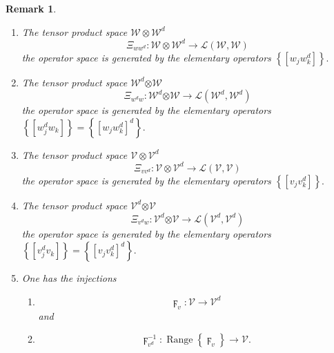 \documentclass[aps,preprint]{revtex4}%
\newtheorem{remark}[theorem]{Remark}
\begin{document}
\begin{remark}
\begin{enumerate}
\item The tensor product space $\mathcal{W\otimes W}^{d}$%
\begin{equation}
\Xi_{ww^{d}}:\mathcal{W\otimes W}^{d}\rightarrow\mathcal{L}\left(
\mathcal{W},\mathcal{W}\right)
\end{equation}
the operator space is generated by the elementary operators $\left\{  \left[
w_{j}w_{k}^{d}\right]  \right\}  .$

\item The tensor product space $\mathcal{W}^{d}\mathcal{\otimes W}$%
\begin{equation}
\Xi_{w^{d}w}:\mathcal{W}^{d}\mathcal{\otimes W}\rightarrow\mathcal{L}\left(
\mathcal{W}^{d},\mathcal{W}^{d}\right)
\end{equation}
the operator space is generated by the elementary operators $\left\{  \left[
w_{j}^{d}w_{k}\right]  \right\}  =\left\{  \left[  w_{j}w_{k}^{d}\right]
^{d}\right\}  .$

\item The tensor product space $\mathcal{V\otimes V}^{d}$%
\begin{equation}
\Xi_{vv^{d}}:\mathcal{V\otimes V}^{d}\rightarrow\mathcal{L}\left(
\mathcal{V},\mathcal{V}\right)
\end{equation}
the operator space is generated by the elementary operators $\left\{  \left[
v_{j}v_{k}^{d}\right]  \right\}  .$

\item The tensor product space $\mathcal{V}^{d}\mathcal{\otimes V}$%
\begin{equation}
\Xi_{v^{d}w}:\mathcal{V}^{d}\mathcal{\otimes V}\rightarrow\mathcal{L}\left(
\mathcal{V}^{d},\mathcal{V}^{d}\right)
\end{equation}
the operator space is generated by the elementary operators $\left\{  \left[
v_{j}^{d}v_{k}\right]  \right\}  =\left\{  \left[  v_{j}v_{k}^{d}\right]
^{d}\right\}  .$

\item One has the injections

\begin{enumerate}
\item
\begin{equation}
\digamma_{v}:\mathcal{V}\rightarrow\mathcal{V}^{d}%
\end{equation}
and

\item
\begin{equation}
\digamma_{v^{d}}^{-1}:\operatorname*{Range}\left\{  \digamma_{v}\right\}
\rightarrow\mathcal{V}.
\end{equation}


\end{enumerate}
\end{enumerate}
\end{remark}
\end{document}
